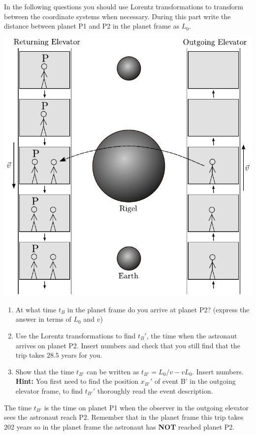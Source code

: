 {\begin{multicols}{2}
In the following questions you should use Lorentz transformations to transform between the coordinate systems when necessary. During this part write the distance between planet P1 and P2 in the planet frame as $L_0$.
\begin{Figure}%
\centering
\includegraphics[width=\textwidth]{fig_9-5.pdf}
\end{Figure}
\begin{enumerate}
\item At what time $t_B$ in the planet frame do you arrive at planet P2? (express the answer in terms of $L_0$ and $v$)

\item Use the Lorentz transformations to find $t_B'$, the time when the astronaut arrives on planet P2. Insert numbers and check that you still find that the trip takes $28.5$ years for you. 
 
\item Show that the time $t_{B'}$ can be written as $t_{B'}=L_0/v-vL_0$. Insert numbers. {\bf Hint:} You first need to find the position $x_{B'}'$ of event B' in the outgoing elevator frame, to find $t_{B'}'$ thoroughly read the event description.
\end{enumerate}
The time $t_{B'}$ is the time on planet P1 when the observer in the outgoing elevator sees the astronaut reach P2. Remember that in the planet frame this trip takes $202$ years so in the planet frame the astronaut has {\bf NOT} reached planet P2.
\begin{enumerate}
\setcounter{enumi}{3}


\end{enumerate}
\end{multicols}}
